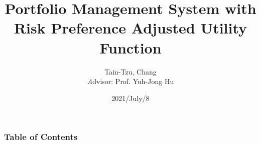 \documentclass{beamer}
\title{Portfolio Management System with Risk Preference Adjusted Utility Function}
\author{
{Tain-Tzu, Chang}
\\
{\textit Advisor:} 
{Prof. Yuh-Jong Hu}
}
\institute{Department of Computer Science, NCCU}
\date{2021/July/8}
\begin{document}
\frame{\titlepage}

\begin{frame}
\frametitle{Table of Contents}
\begin{multicols}{2}
\tableofcontents[subsectionstyle=hide]
\end{multicols}
\end{frame}









\end{document}
